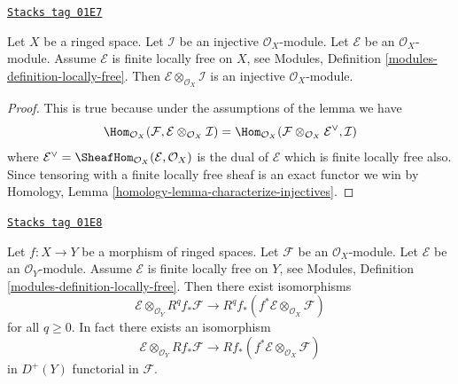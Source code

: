 \begin{lemma}
\label{cohomology-lemma-injective-tensor-finite-locally-free}
\href{https://stacks.math.columbia.edu/tag/01E7}{\texttt{Stacks tag 01E7}}

Let $X$ be a ringed space.
Let $\mathcal{I}$ be an injective $\mathcal{O}_X$-module.
Let $\mathcal{E}$ be an $\mathcal{O}_X$-module.
Assume $\mathcal{E}$ is finite locally free on $X$, see
Modules, Definition \ref{modules-definition-locally-free}.
Then $\mathcal{E} \otimes_{\mathcal{O}_X} \mathcal{I}$ is
an injective $\mathcal{O}_X$-module.
\end{lemma}

\begin{proof}
This is true because under the assumptions of the lemma we have
$$
\Hom_{\mathcal{O}_X}(\mathcal{F},
\mathcal{E} \otimes_{\mathcal{O}_X} \mathcal{I})
=
\Hom_{\mathcal{O}_X}(
\mathcal{F} \otimes_{\mathcal{O}_X} \mathcal{E}^\vee, \mathcal{I})
$$
where
$\mathcal{E}^\vee = \SheafHom_{\mathcal{O}_X}(\mathcal{E}, \mathcal{O}_X)$
is the dual of $\mathcal{E}$ which is finite locally free also. Since tensoring
with a finite locally free sheaf is an exact functor we win by
Homology, Lemma \ref{homology-lemma-characterize-injectives}.
\end{proof}

\begin{lemma}
\label{cohomology-lemma-projection-formula}
\href{https://stacks.math.columbia.edu/tag/01E8}{\texttt{Stacks tag 01E8}}

Let $f : X \to Y$ be a morphism of ringed spaces.
Let $\mathcal{F}$ be an $\mathcal{O}_X$-module.
Let $\mathcal{E}$ be an $\mathcal{O}_Y$-module.
Assume $\mathcal{E}$ is finite locally free on $Y$, see
Modules, Definition \ref{modules-definition-locally-free}.
Then there exist isomorphisms
$$
\mathcal{E} \otimes_{\mathcal{O}_Y} R^qf_*\mathcal{F}
\longrightarrow
R^qf_*(f^*\mathcal{E} \otimes_{\mathcal{O}_X} \mathcal{F})
$$
for all $q \geq 0$. In fact there exists an isomorphism
$$
\mathcal{E} \otimes_{\mathcal{O}_Y} Rf_*\mathcal{F}
\longrightarrow
Rf_*(f^*\mathcal{E} \otimes_{\mathcal{O}_X} \mathcal{F})
$$
in $D^{+}(Y)$ functorial in $\mathcal{F}$.
\end{lemma}

